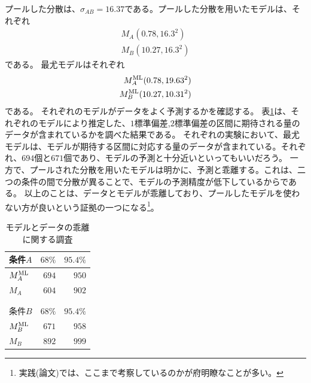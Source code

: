 プールした分散は、$\sigma_{AB}=16.37$である。プールした分散を用いたモデルは、それぞれ
\begin{eqnarray*}
 M_A(0.78,16.3^2)\\
 M_B(10.27,16.3^2)
\end{eqnarray*}
である。
最尤モデルはそれぞれ
\begin{eqnarray}
 M_A^{\rm{ML}}(0.78, 19.63^2)\\
 M_B^{\rm{ML}}(10.27, 10.31^2)
\end{eqnarray}
である。
それぞれのモデルがデータをよく予測するかを確認する。
表\ref{table:cohen_d_model_data_diff}は、それぞれのモデルにより推定した、$1$標準偏差,$2$標準偏差の区間に期待される量のデータが含まれているかを調べた結果である。
それぞれの実験において、最尤モデルは、モデルが期待する区間に対応する量のデータが含まれている。それぞれ、$694$個と$671$個であり、モデルの予測と十分近いといってもいいだろう。
一方で、プールされた分散を用いたモデルは明かに、予測と乖離する。これは、二つの条件の間で分散が異ることで、モデルの予測精度が低下しているからである。
以上のことは、データとモデルが乖離しており、プールしたモデルを使わない方が良いという証拠の一つになる\footnote{実践(論文)では、ここまで考察しているのかが府明瞭なことが多い。}。

\begin{table}[hbtp]
 \caption{モデルとデータの乖離に関する調査}
 \label{table:cohen_d_model_data_diff}
 \centering
\begin{tabular}{lrr}
\hline
{}条件$A$ &   $68\%$ &   $95.4\%$ \\
\hline
 $M_A^{\rm{ML}}$& $694$  & $950$ \\
 $M_A$ & $604$  & $902$ \\
\hline \\ \\
\hline
{}条件$B$ &   $68\%$ &   $95.4\%$ \\
\hline
 $M_B^{\rm{ML}}$& $671$  & $958$ \\
 $M_B$ & $892$  & $999$ \\
\hline
\end{tabular}
\end{table}


